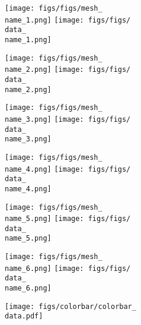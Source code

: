 \documentclass{article}
\edef\name{\name}
\begin{document}
\begin{center}
  \begin{minipage}{0.49\linewidth}
    \centering
    \texttt{[image: figs/figs/mesh\_\\name\_1.png]}
    \texttt{[image: figs/figs/\\data\_\\name\_1.png]}
  \end{minipage}
  \begin{minipage}{0.49\linewidth}
    \centering
    \texttt{[image: figs/figs/mesh\_\\name\_2.png]}
    \texttt{[image: figs/figs/\\data\_\\name\_2.png]}
  \end{minipage}
  \begin{minipage}{0.49\linewidth}
    \centering
    \texttt{[image: figs/figs/mesh\_\\name\_3.png]}
    \texttt{[image: figs/figs/\\data\_\\name\_3.png]}
  \end{minipage}
  \begin{minipage}{0.49\linewidth}
    \centering
    \texttt{[image: figs/figs/mesh\_\\name\_4.png]}
    \texttt{[image: figs/figs/\\data\_\\name\_4.png]}
  \end{minipage}
  \begin{minipage}{0.49\linewidth}
    \centering
    \texttt{[image: figs/figs/mesh\_\\name\_5.png]}
    \texttt{[image: figs/figs/\\data\_\\name\_5.png]}
  \end{minipage}
  \begin{minipage}{0.49\linewidth}
    \centering
    \texttt{[image: figs/figs/mesh\_\\name\_6.png]}
    \texttt{[image: figs/figs/\\data\_\\name\_6.png]}
  \end{minipage}
  \texttt{[image: figs/colorbar/colorbar\_\\data.pdf]}
\end{center}
\end{document}
